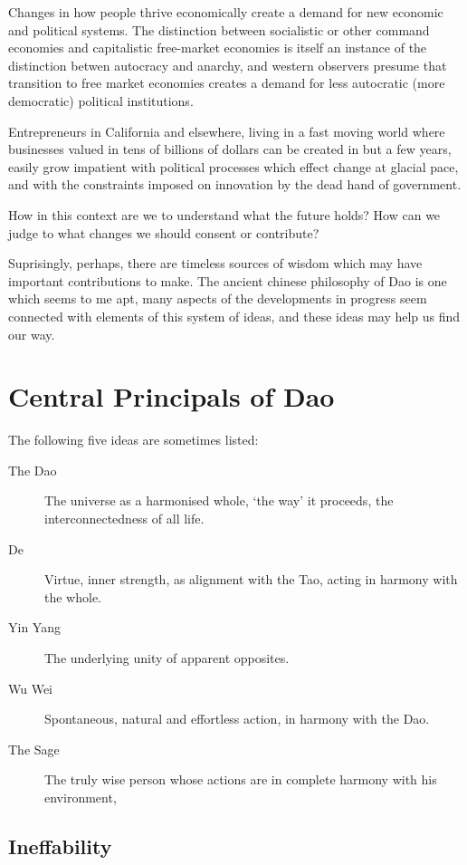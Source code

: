 \documentclass[10pt,titlepage]{article}
\begin{document}
Changes in how people thrive economically create a demand for new economic and political systems.
The distinction between socialistic or other command economies and capitalistic free-market economies is itself an instance of the distinction betwen autocracy and anarchy, and western observers presume that transition to free market economies creates a demand for less autocratic (more democratic) political institutions. 

Entrepreneurs in California and elsewhere, living in a fast moving world where businesses valued in tens of billions of dollars can be created in but a few years, easily grow impatient with political processes which effect change at glacial pace, and with the constraints imposed on innovation by the dead hand of government.

How in this context are we to understand what the future holds?
How can we judge to what changes we should consent or contribute?

Suprisingly, perhaps, there are timeless sources of wisdom which may have important contributions to make.
The ancient chinese philosophy of Dao is one which seems to me apt, many aspects of the developments in progress seem connected with elements of this system of ideas, and these ideas may help us find our way.

\section{Central Principals of Dao}

The following five ideas are sometimes listed:

\begin{description}
\item[The Dao]
The universe as a harmonised whole, `the way' it proceeds, the interconnectedness of all life.
\item [De]
Virtue, inner strength, as alignment with the Tao, acting in harmony with the whole.
\item [Yin Yang]
The underlying unity of apparent opposites.
\item [Wu Wei]
Spontaneous, natural and effortless action, in harmony with the Dao.
\item [The Sage]
The truly wise person whose actions are in complete harmony with his environment, 
\end{description}

\subsection{Ineffability}
\end{document}

